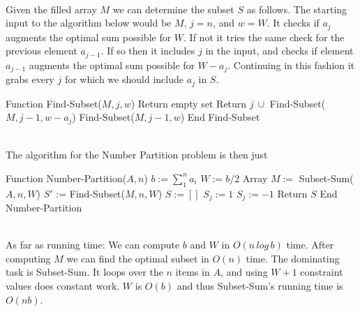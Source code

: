 \documentclass[11pt]{article}
\begin{document}
\\
Given the filled array $M$ we can determine the subset $S$ as follows. The starting input to the algorithm below would be $M$, $j=n$, and $w = W$. It checks if $a_j$ augments the optimal sum possible for $W$. If not it tries the same check for the previous element $a_{j-1}$. If so then it includes $j$ in the input, and checks if element $a_{j-1}$ augments the optimal sum possible for $W - a_j$. Continuing in this fashion it grabs every $j$ for which we should include $a_j$ in $S$.\\
\begin{algorithmic}
\STATE Function Find-Subset($M, j, w$)
\STATE Return empty set
\STATE Return $j\ \cup $ Find-Subset($M,j-1,w-a_j$)
\ELSE
\STATE  Find-Subset($M,j-1,w$)
\ENDIF
\STATE End Find-Subset
\end{algorithmic}
\leavevmode
\\
The algorithm for the Number Partition problem is then just
\begin{algorithmic}
\STATE Function Number-Partition($A, n$)
\STATE $b := \sum_1^n a_i$
\STATE $W := b/2$
\STATE Array $M := $ Subset-Sum($A, n, W$)
\STATE $S'$ := Find-Subset($M,n,W$)
\STATE $S := []$ 
\STATE $S_j := 1$
\ELSE
\STATE $S_j := -1$
\ENDIF
\ENDFOR
\STATE Return $S$
\STATE End Number-Partition
\end{algorithmic}
\leavevmode
\\
As far as running time: We can compute $b$ and $W$ in $O(n\,log \,b)$ time. After computing $M$ we can find the optimal subset in $O(n)$ time. The dominating task is Subset-Sum. It loops over the $n$ items in $A$, and using $W+1$ constraint values does constant work. $W$ is $O(b)$ and thus Subset-Sum's running time is $O(nb)$. 
\\
\\
\end{document}
